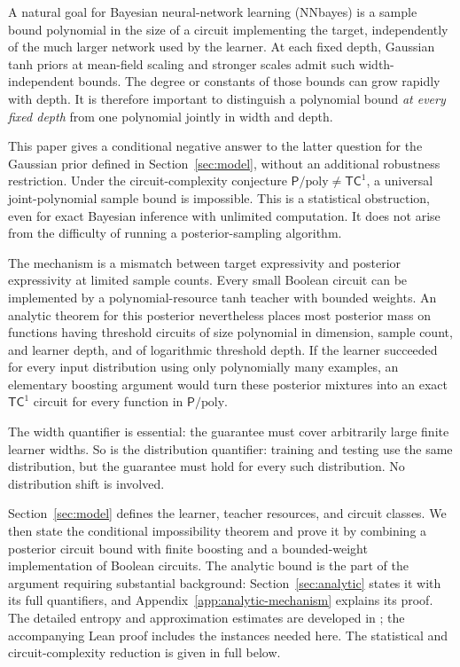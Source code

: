 \documentclass[11pt]{article}
\theoremstyle{remark}\newtheorem{remark}[theorem]{Remark}
\newcommand{\Pp}{\mathsf P/\mathrm{poly}}
\newcommand{\TC}{\mathsf{TC}}
\begin{document}
A natural goal for Bayesian neural-network learning (NNbayes) is a sample bound
polynomial in the size of a circuit implementing the target, independently
of the much larger network used by the learner. At each fixed depth,
Gaussian tanh priors at mean-field scaling and stronger scales admit such
width-independent bounds. The degree or constants of those bounds can
grow rapidly with depth. It is therefore important to distinguish a
polynomial bound \emph{at every fixed depth} from one polynomial jointly
in width and depth.

This paper gives a conditional negative answer to the latter question for
the Gaussian prior defined in Section~\ref{sec:model}, without an
additional robustness restriction. Under the circuit-complexity
conjecture $\Pp\ne\TC^1$, a universal joint-polynomial sample bound is
impossible. This is a statistical obstruction, even for exact Bayesian
inference with unlimited computation. It does not arise from the difficulty
of running a posterior-sampling algorithm.

The mechanism is a mismatch between target expressivity and posterior
expressivity at limited sample counts. Every small Boolean circuit can be
implemented by a polynomial-resource tanh teacher with bounded weights.
An analytic theorem for this posterior nevertheless places most
posterior mass on functions having threshold circuits of size polynomial
in dimension, sample count, and learner depth, and of logarithmic
threshold depth. If the learner succeeded for every input distribution
using only polynomially many examples, an elementary boosting argument would
turn these posterior mixtures into an exact $\TC^1$ circuit for every
function in $\Pp$.

The width quantifier is essential: the guarantee must cover arbitrarily
large finite learner widths. So is the distribution quantifier: training
and testing use the same distribution, but the guarantee must hold for
every such distribution. No distribution shift is involved.

Section~\ref{sec:model} defines the learner, teacher resources, and
circuit classes. We then state the conditional impossibility theorem and
prove it by combining a posterior circuit bound with finite boosting and
a bounded-weight implementation of Boolean circuits. The analytic bound
is the part of the argument requiring substantial background:
Section~\ref{sec:analytic} states it with its full quantifiers, and
Appendix~\ref{app:analytic-mechanism} explains its proof. The detailed
entropy and approximation estimates are developed in \cite{barriers};
the accompanying Lean proof includes the instances needed here. The
statistical and circuit-complexity reduction is given in full below.
\end{document}
